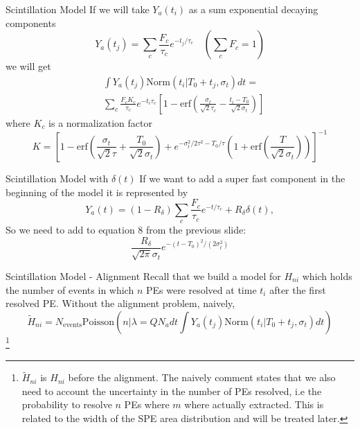 \documentclass{beamer}
\newcommand\blfootnote[1]{%
  \begingroup
  \renewcommand\thefootnote{}\footnote{#1}%
  \addtocounter{footnote}{-1}%
  \endgroup
}
\begin{document}
\begin{frame}{Scintillation Model}
If we will take $Y_a(t_i)$ as a sum exponential decaying components
\begin{equation}
Y_a(t_j)=\sum_c\frac{F_c}{\tau_c}e^{-t_j/\tau_c} \quad (\sum_cF_c=1)
\end{equation}
we will get 
\begin{equation}
\begin{split}
&\int Y_a(t_j)\text{Norm}(t_i|T_0+t_j, \sigma_t)dt=\\
&\sum_c\frac{F_cK_c}{\tau_c}e^{-t_i\tau_c}\left[1-\text{erf}\left(\frac{\sigma_t}{\sqrt{2}\tau_c}-\frac{t_i-T_0}{\sqrt{2}\sigma_t}\right)\right]
\end{split}
\end{equation}
where $K_c$ is a normalization factor
\begin{equation}
K=\left[1-\text{erf}\left(\frac{\sigma_t}{\sqrt{2}\tau}+\frac{T_0}{\sqrt{2}\sigma_t}\right)+e^{-\sigma_t^2/2\tau^2-T_0/\tau}\left(1+\text{erf}\left(\frac{T}{\sqrt{2}\sigma_t}\right)\right)\right]^{-1}
\end{equation}
\end{frame}

\begin{frame}{Scintillation Model with $\delta(t)$}
If we want to add a super fast component in the beginning of the model it is represented by
\begin{equation}
Y_a(t)=(1-R_\delta)\sum_c\frac{F_c}{\tau_c}e^{-t/\tau_c}+R_\delta\delta(t),
\end{equation}
So we need to add to equation 8 from the previous slide:
\begin{equation}
\frac{R_\delta}{\sqrt{2\pi}\sigma_t}e^{-(t-T_0)^2/(2\sigma_t^2)}
\end{equation}
\end{frame}

\begin{frame}{Scintillation Model - Alignment}
Recall that we build a model for $H_{ni}$ which holds the number of events in which $n$ PEs were resolved at time $t_i$ after the first resolved PE.
Without the alignment problem, naively, 
\begin{equation}
\tilde{H}_{ni}=N_{\text{events}}\text{Poisson}\left(n\bigg|\lambda=QN_adt\int Y_a(t_j)\text{Norm}(t_i|T_0+t_j, \sigma_t)dt\right)
\end{equation}
\blfootnote{$\tilde{H}_{ni}$ is $H_{ni}$ before the alignment. The naively comment states that we also need to account the uncertainty in the number of PEs resolved, i.e the probability to resolve $n$ PEs where $m$ where actually extracted. This is related to the width of the SPE area distribution  and will be treated later.}
\end{frame}
\end{document}
